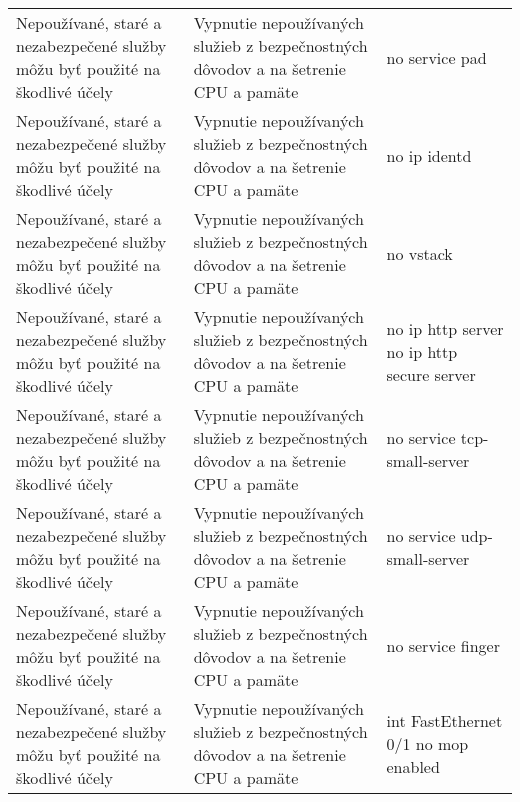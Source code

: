 \begin{longtable}[!htbp]{|L{10em}L{10em}L{34em}|}
	
	Nepoužívané, staré a nezabezpečené služby môžu byť použité na škodlivé účely	&Vypnutie nepoužívaných služieb z bezpečnostných dôvodov a na šetrenie CPU a pamäte 	&no service pad\\
	
	
	
	
	 Nepoužívané, staré a nezabezpečené služby môžu byť použité na škodlivé účely	&Vypnutie nepoužívaných služieb z bezpečnostných dôvodov a na šetrenie CPU a pamäte 	&no ip identd\\
	
	
	
	Nepoužívané, staré a nezabezpečené služby môžu byť použité na škodlivé účely	&Vypnutie nepoužívaných služieb z bezpečnostných dôvodov a na šetrenie CPU a pamäte 	&no vstack\\
	
	
	
	 Nepoužívané, staré a nezabezpečené služby môžu byť použité na škodlivé účely	&Vypnutie nepoužívaných služieb z bezpečnostných dôvodov a na šetrenie CPU a pamäte 	&no ip http server
	no ip http secure server\\
	
	
	
	Nepoužívané, staré a nezabezpečené služby môžu byť použité na škodlivé účely	&Vypnutie nepoužívaných služieb z bezpečnostných dôvodov a na šetrenie CPU a pamäte 	&no service tcp-small-server\\
	
	
	
	
	 Nepoužívané, staré a nezabezpečené služby môžu byť použité na škodlivé účely	&Vypnutie nepoužívaných služieb z bezpečnostných dôvodov a na šetrenie CPU a pamäte 	&no service udp-small-server\\
	
	
	
	Nepoužívané, staré a nezabezpečené služby môžu byť použité na škodlivé účely	&Vypnutie nepoužívaných služieb z bezpečnostných dôvodov a na šetrenie CPU a pamäte 	&no service finger\\
	
	
	
	
	 Nepoužívané, staré a nezabezpečené služby môžu byť použité na škodlivé účely	&Vypnutie nepoužívaných služieb z bezpečnostných dôvodov a na šetrenie CPU a pamäte 	&int FastEthernet 0/1
	no mop enabled\\
	

\end{longtable}
